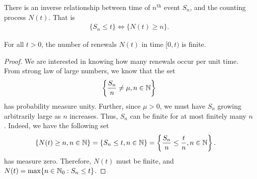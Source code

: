 \documentclass[a4paper,10pt, english]{article}
\begin{document}
\begin{lem}
	There is an inverse relationship between time of $n^{\text{th}}$ event $S_n$, and the counting process $N(t)$. That is
	\begin{align}
	\label{eq:InverseRelationship}
	\{S_n \leq t\} \iff \{N(t) \geq n\}.
	\end{align}
\end{lem}

\begin{lem}[Finiteness of $N(t)$]
For all $t > 0$, the number of renewals $N(t)$ in time $[0,t)$ is finite. 
\end{lem}
\begin{proof}
We are interested in knowing how many renewals occur per unit time. 
From strong law of large numbers, we know that the set 
\begin{align*} 
\left\{\frac{S_n}{n} \neq \mu, n \in \mathbb{N}\right\}
\end{align*}
has probability measure unity. 
Further, since $\mu > 0$, we must have $S_n$ growing arbitrarily large as $n$ increases. 
Thus, $S_n$ can be finite for at most finitely many $n$. 
Indeed, we have the following set 
\begin{align*}
\{N(t) \geq n, n \in \N\} &= \{S_n \leq t, n \in \N\} = \left\{\frac{S_n}{n} \leq \frac{t}{n}, n \in \N \right\}.%
\end{align*}
has measure zero. 
Therefore, $N(t)$ must be finite, and
$N(t) = \max\{n \in \mathbb{N}_0 : S_n \leq t\}$.
\end{proof}
\end{document}

